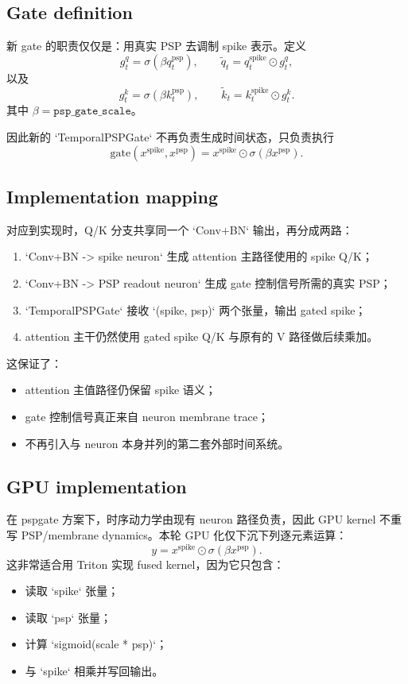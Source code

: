 \subsection{Gate definition}
新 gate 的职责仅仅是：用真实 PSP 去调制 spike 表示。定义
\[
g_t^q = \sigma(\beta q_t^{\mathrm{psp}}),
\qquad
\tilde q_t = q_t^{\mathrm{spike}} \odot g_t^q,
\]
以及
\[
g_t^k = \sigma(\beta k_t^{\mathrm{psp}}),
\qquad
\tilde k_t = k_t^{\mathrm{spike}} \odot g_t^k.
\]
其中 $\beta = \texttt{psp\_gate\_scale}$。

因此新的 `TemporalPSPGate` 不再负责生成时间状态，只负责执行
\[
\mathrm{gate}(x^{\mathrm{spike}}, x^{\mathrm{psp}})
= x^{\mathrm{spike}} \odot \sigma(\beta x^{\mathrm{psp}}).
\]

\subsection{Implementation mapping}
对应到实现时，Q/K 分支共享同一个 `Conv+BN` 输出，再分成两路：
\begin{enumerate}
  \item `Conv+BN -> spike neuron` 生成 attention 主路径使用的 spike Q/K；
  \item `Conv+BN -> PSP readout neuron` 生成 gate 控制信号所需的真实 PSP；
  \item `TemporalPSPGate` 接收 `(spike, psp)` 两个张量，输出 gated spike；
  \item attention 主干仍然使用 gated spike Q/K 与原有的 V 路径做后续乘加。
\end{enumerate}

这保证了：
\begin{itemize}
  \item attention 主值路径仍保留 spike 语义；
  \item gate 控制信号真正来自 neuron membrane trace；
  \item 不再引入与 neuron 本身并列的第二套外部时间系统。
\end{itemize}

\subsection{GPU implementation}
在 pspgate 方案下，时序动力学由现有 neuron 路径负责，因此 GPU kernel 不重写 PSP/membrane dynamics。本轮 GPU 化仅下沉下列逐元素运算：
\[
y = x^{\mathrm{spike}} \odot \sigma(\beta x^{\mathrm{psp}}).
\]
这非常适合用 Triton 实现 fused kernel，因为它只包含：
\begin{itemize}
  \item 读取 `spike` 张量；
  \item 读取 `psp` 张量；
  \item 计算 `sigmoid(scale * psp)`；
  \item 与 `spike` 相乘并写回输出。
\end{itemize}

